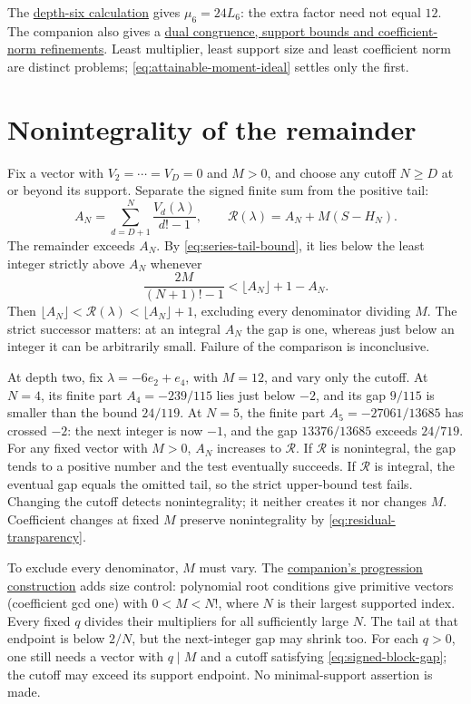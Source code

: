 \documentclass[11pt]{article}
\begin{document}
The \href{erdos68-factorial-reasoning-surface.pdf\#r15-depth-six}{depth-six calculation}
gives $\mu_6=24L_6$: the extra factor need not equal $12$. The companion also gives a
\href{erdos68-factorial-reasoning-surface.pdf\#r5-depth-refinements}{dual congruence, support bounds and coefficient-norm refinements}.
Least multiplier, least support size and least coefficient norm are
distinct problems; \eqref{eq:attainable-moment-ideal} settles only the first.

\section{Nonintegrality of the remainder}\label{sec:open}\label{sec:plateau}

Fix a vector with $V_2=\cdots=V_D=0$ and $M>0$, and choose any
cutoff $N\ge D$ at or beyond its support. Separate the signed finite
sum from the positive tail:
\[
 A_N=\sum_{d=D+1}^N\frac{V_d(\lambda)}{d!-1},\qquad
 \mathcal R(\lambda)=A_N+M(S-H_N).
\]
The remainder exceeds $A_N$. By \eqref{eq:series-tail-bound}, it lies
below the least integer strictly above $A_N$ whenever
\begin{equation}
 \frac{2M}{(N+1)!-1}<\lfloor A_N\rfloor+1-A_N.
 \label{eq:signed-block-gap}
\end{equation}
Then $\lfloor A_N\rfloor<\mathcal R(\lambda)<\lfloor A_N\rfloor+1$,
excluding every denominator dividing $M$. The strict successor matters: at an
integral $A_N$ the gap is one, whereas just below an integer it can be
arbitrarily small. Failure of the comparison is inconclusive.

At depth two, fix $\lambda=-6e_2+e_4$, with $M=12$, and vary only
the cutoff. At $N=4$, its finite part
$A_4=-239/115$ lies just below $-2$, and its gap $9/115$ is smaller
than the bound $24/119$. At $N=5$, the finite part
$A_5=-27061/13685$ has crossed $-2$: the next integer is now $-1$,
and the gap $13376/13685$ exceeds $24/719$.
For any fixed vector with $M>0$, $A_N$ increases to $\mathcal R$.
If $\mathcal R$ is nonintegral, the gap tends to a positive number and
the test eventually succeeds. If $\mathcal R$ is integral, the eventual
gap equals the omitted tail, so the strict upper-bound test fails.
Changing the cutoff detects nonintegrality; it neither creates it nor
changes $M$. Coefficient changes at fixed $M$ preserve nonintegrality
by \eqref{eq:residual-transparency}.

To exclude every denominator, $M$ must vary. The
\href{erdos68-factorial-reasoning-surface.pdf\#r5-progression}{companion's progression construction}
adds size control: polynomial root conditions give primitive vectors
(coefficient gcd one) with $0<M<N!$, where $N$ is their largest
supported index. Every fixed $q$ divides their multipliers for all
sufficiently large $N$. The tail at that endpoint is below $2/N$, but
the next-integer gap may shrink too. For each $q>0$, one still needs
a vector with $q\mid M$ and a cutoff satisfying
\eqref{eq:signed-block-gap}; the cutoff may exceed its support endpoint.
No minimal-support assertion is made.
\end{document}
